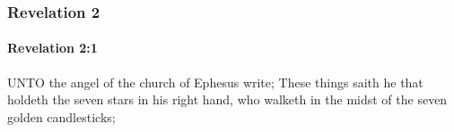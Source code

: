 			\begin{framed}
			\scriptsize
				\begin{compactdesc}
					\item[SBLG] 
				\end{compactdesc}
			\end{framed}

	\subsubsection{Revelation 2} %
		\label{REVELATIONNT-2}
		
		\paragraph{Revelation 2:1} %
			\label{REVELATIONNT-2-1}

			UNTO the angel of the church of Ephesus write; These things saith he that holdeth the seven stars in his right hand, who walketh in the midst of the seven golden candlesticks;

